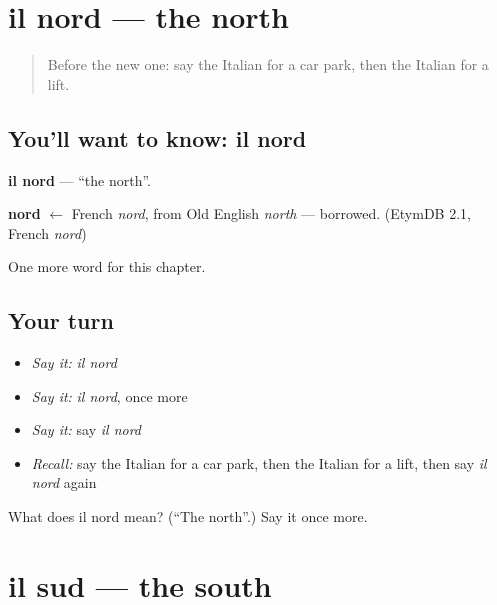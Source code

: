 \section[il nord]{il nord — the north}

\label{lesson:IT-C90-nord}



\begin{quote}
Before the new one: say the Italian for a car park, then the Italian for a lift.
\end{quote}

\subsection*{You'll want to know: il nord}
\textbf{il nord} — \textquotedblleft{}the north\textquotedblright{}.

\begin{cousinweb}
\textbf{nord} $\leftarrow$ French \emph{nord}, from Old English \emph{north} — borrowed. (EtymDB 2.1, French \emph{nord})
\end{cousinweb}

\begin{grammarlens}[title={What you've built}]
One more word for this chapter.
\end{grammarlens}

\subsection*{Your turn}
\begin{itemize}
\raggedright
  \item \emph{Say it:} \emph{il nord}
  \item \emph{Say it:} \emph{il nord}, once more
  \item \emph{Say it:} say \emph{il nord}
  \item \emph{Recall:} say the Italian for a car park, then the Italian for a lift, then say \emph{il nord} again
\end{itemize}

\begin{tcolorbox}[breakable,colback=teal!4,colframe=teal!35!black,title={Before you move on}]
What does il nord mean? (\textquotedblleft{}The north\textquotedblright{}.) Say it once more.
\end{tcolorbox}
\section[il sud]{il sud — the south}

